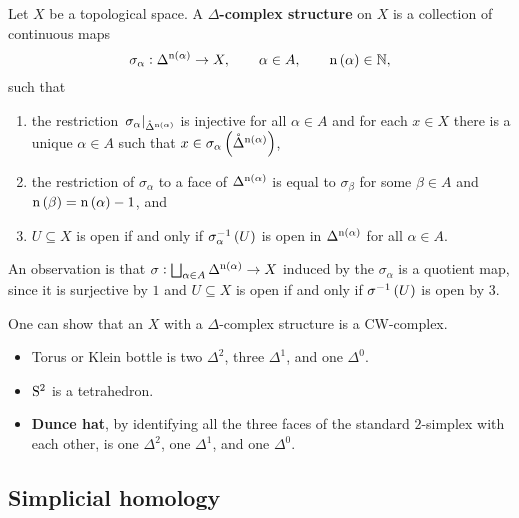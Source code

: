 \begin{definition*}
Let $ X $ be a topological space. A \textbf{$ \Delta $-complex structure} on $ X $ is a collection of continuous maps
$$ \sigma_\alpha : \Delta^{\n\br{\alpha}} \to X, \qquad \alpha \in A, \qquad \n\br{\alpha} \in \NN, $$
such that
\begin{enumerate}
\item the restriction $ \eval{\sigma_\alpha}_{\mathring{\Delta}^{\n\br{\alpha}}} $ is injective for all $ \alpha \in A $ and for each $ x \in X $ there is a unique $ \alpha \in A $ such that $ x \in \sigma_\alpha\br{\mathring{\Delta}^{\n\br{\alpha}}} $,
\item the restriction of $ \sigma_\alpha $ to a face of $ \Delta^{\n\br{\alpha}} $ is equal to $ \sigma_\beta $ for some $ \beta \in A $ and $ \n\br{\beta} = \n\br{\alpha} - 1 $, and
\item $ U \subseteq X $ is open if and only if $ \sigma_\alpha^{-1}\br{U} $ is open in $ \Delta^{\n\br{\alpha}} $ for all $ \alpha \in A $.
\end{enumerate}
\end{definition*}

An observation is that $ \sigma : \bigsqcup_{\alpha \in A} \Delta^{\n\br{\alpha}} \to X $ induced by the $ \sigma_\alpha $ is a quotient map, since it is surjective by $ 1 $ and $ U \subseteq X $ is open if and only if $ \sigma^{-1}\br{U} $ is open by $ 3 $.

\begin{remark*}
One can show that an $ X $ with a $ \Delta $-complex structure is a CW-complex.
\end{remark*}

\begin{example*}
\hfill
\begin{itemize}
\item Torus or Klein bottle is two $ \Delta^2 $, three $ \Delta^1 $, and one $ \Delta^0 $.
\item $ \S^2 $ is a tetrahedron.
\item \textbf{Dunce hat}, by identifying all the three faces of the standard $ 2 $-simplex with each other, is one $ \Delta^2 $, one $ \Delta^1 $, and one $ \Delta^0 $.
\end{itemize}
\end{example*}

\subsection{Simplicial homology}

